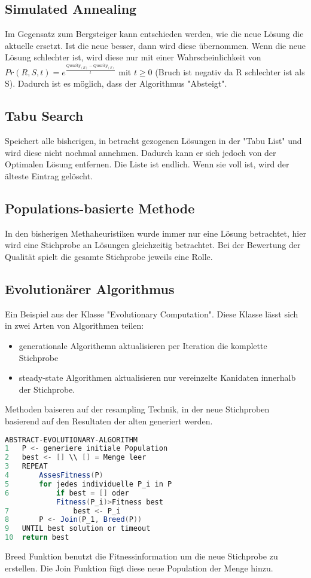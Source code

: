 \documentclass[jou,apacite]{apa6}
\begin{document}
\subsection{Simulated Annealing}
Im Gegensatz zum Bergsteiger kann entschieden werden, wie die neue Lösung die aktuelle ersetzt. Ist die neue besser, dann wird diese übernommen. Wenn die neue Lösung schlechter ist, wird diese nur mit einer Wahrscheinlichkeit von $Pr(R, S, t) = e^{\frac{Quality_{(R)}-Quality_{(S)}}{t}}$ mit $t \ge 0$ (Bruch ist negativ da R schlechter ist als S). Dadurch ist es möglich, dass der Algorithmus "Absteigt".

\subsection{Tabu Search}
Speichert alle bisherigen, in betracht gezogenen Lösungen in der "Tabu List" und wird diese nicht nochmal annehmen. Dadurch kann er sich jedoch von der Optimalen Lösung entfernen. Die Liste ist endlich. Wenn sie voll ist, wird der älteste Eintrag gelöscht.

\subsection{Populations-basierte Methode}
In den bisherigen Methaheuristiken wurde immer nur eine Lösung betrachtet, hier wird eine Stichprobe an Lösungen gleichzeitig betrachtet. Bei der Bewertung der Qualität spielt die gesamte Stichprobe jeweils eine Rolle. 

\subsection{Evolutionärer Algorithmus}
Ein Beispiel aus der Klasse "Evolutionary Computation". Diese Klasse lässt sich in zwei Arten von Algorithmen teilen: 
\begin{itemize}
    \item generationale Algorithemn aktualisieren per Iteration die komplette Stichprobe
    \item steady-state Algorithmen aktualisieren nur vereinzelte Kanidaten innerhalb der Stichprobe. 
\end{itemize}
Methoden baiseren auf der resampling Technik, in der neue Stichproben basierend auf den Resultaten der alten generiert werden. 

\begin{lstlisting}[language=java]
ABSTRACT-EVOLUTIONARY-ALGORITHM
1   P <- generiere initiale Population
2   best <- [] \\ [] = Menge leer
3   REPEAT
4       AssesFitness(P)
5       for jedes individuelle P_i in P
6           if best = [] oder 
            Fitness(P_i)>Fitness best 
7               best <- P_i
8       P <- Join(P_1, Breed(P))
9   UNTIL best solution or timeout
10  return best
\end{lstlisting}
Breed Funktion benutzt die Fitnessinformation um die neue Stichprobe zu erstellen. Die Join Funktion fügt diese neue Population der Menge hinzu. \\
\end{document}
